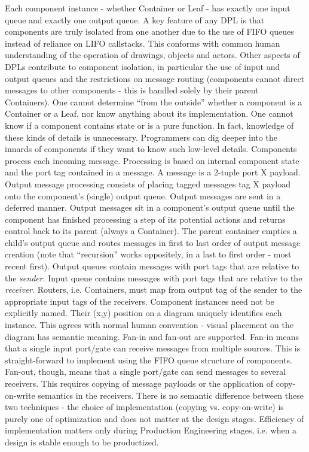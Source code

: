 \documentclass[10pt,anonymous,review]{acmart}
\begin{document}
Each component instance - whether Container or Leaf - has exactly one input queue and exactly one output queue.
A key feature of any DPL is that components are truly isolated from one another due to the use of FIFO queues instead of reliance on LIFO callstacks. This conforms with common human understanding of the operation of drawings, objects and actors. Other aspects of DPLs contribute to component isolation, in particular the use of input and output queues and the restrictions on message routing (components cannot direct messages to other components - this is handled solely by their parent Containers).
One cannot determine “from the outside” whether a component is a Container or a Leaf, nor know anything about its implementation. One cannot know if a component contains state or is a pure function. In fact, knowledge of these kinds of details is unnecessary. Programmers can dig deeper into the innards of components if they want to know such low-level details.
Components process each incoming message. Processing is based on internal component state and the port tag contained in a message. A message is a 2-tuple {port X payload}.
Output message processing consists of placing tagged messages {tag X payload} onto the component’s (single) output queue. Output messages are sent in a deferred manner. Output messages sit in a component’s output queue until the component has finished processing a step of its potential actions and returns control back to its parent (always a Container). The parent container empties a child’s output queue and routes messages in first to last order of output message creation (note that “recursion” works oppositely, in a last to first order - most recent first).
Output queues contain messages with port tags that are relative to the \emph{sender}. Input queue contains messages with port tags that are relative to the \emph{receiver}. Routers, i.e. Containers, must map from output tag of the sender to the appropriate input tags of the receivers.
Component instances need not be explicitly named. Their (x,y) position on a diagram uniquely identifies each instance. This agrees with normal human convention - visual placement on the diagram has semantic meaning.
Fan-in and fan-out are supported. Fan-in means that a single input port/gate can receive messages from multiple sources. This is straight-forward to implement using the FIFO queue structure of components. Fan-out, though, means that a single port/gate can send messages to several receivers. This requires copying of message payloads or the application of copy-on-write semantics in the receivers. There is no semantic difference between these two techniques - the choice of implementation (copying vs. copy-on-write) is purely one of optimization and does not matter at the design stages. Efficiency of implementation matters only during Production Engineering stages, i.e. when a design is stable enough to be productized.
\end{document}
